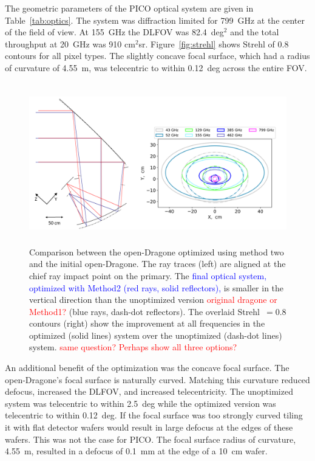\documentclass[]{spie}  %
\newcommand{\comr}[1]{\textcolor{red}{#1}}
\newcommand{\comb}[1]{\textcolor{blue}{#1}}
\begin{document}
The geometric parameters of the PICO optical system are given in Table~\ref{tab:optics}. The 
system was diffraction limited for 799~GHz at the center of the field of view. At 155~GHz the 
DLFOV was 82.4~deg$^2$ and the total throughput at 20~GHz was 910 cm$^2$sr. 
Figure~\ref{fig:strehl} shows Strehl of 0.8 contours for all pixel types.
The slightly concave focal surface, which had a radius of curvature of 4.55~m, was telecentric to 
within 0.12~deg across the entire FOV.

\begin{figure} [ht]
\begin{center}
\includegraphics[height=7cm]{jpl_vs_V3D.png}
\end{center}
\caption { \label{fig:compare} 
Comparison between the open-Dragone optimized using method two and the initial open-Dragone.  
The ray traces (left) are aligned at the chief ray impact point on the primary. 
The \comb{final optical system, optimized with Method2 (red rays, solid reflectors),} is smaller in the vertical direction 
than the unoptimized version \comr{original dragone or Method1?} (blue rays, dash-dot reflectors). The overlaid Strehl~$=0.8$ contours 
(right) show the improvement at all frequencies in the optimized (solid lines) system over the unoptimized (dash-dot lines) system. 
\comr{same question? Perhaps show all three options?}
}
\end{figure} 

An additional benefit of the optimization was the concave focal surface. The open-Dragone's focal surface is naturally curved.  Matching this 
curvature reduced defocus, increased the DLFOV, and increased telecentricity.  The unoptimized system was telecentric to within 
2.5~deg while the optimized version was telecentric to within 0.12~deg. If the focal surface was too strongly curved tiling it with flat detector 
wafers would result in large defocus at the edges of these wafers.  This was not the case for PICO. The focal surface radius of curvature, 4.55~m, 
resulted in a defocus of 0.1~mm at the edge of a 10~cm wafer. 
\end{document}
